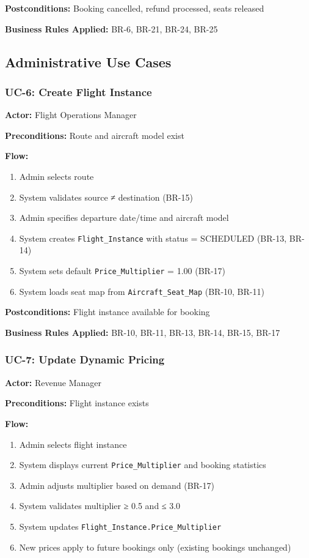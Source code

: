 \documentclass[12pt,a4paper,openany]{report}
\begin{document}
\textbf{Postconditions:} Booking cancelled, refund processed, seats released

\textbf{Business Rules Applied:} BR-6, BR-21, BR-24, BR-25

\subsection{Administrative Use Cases}

\subsubsection{UC-6: Create Flight Instance}
\textbf{Actor:} Flight Operations Manager

\textbf{Preconditions:} Route and aircraft model exist

\textbf{Flow:}
\begin{enumerate}
    \item Admin selects route
    \item System validates source ≠ destination (BR-15)
    \item Admin specifies departure date/time and aircraft model
    \item System creates \texttt{Flight\_Instance} with status = SCHEDULED (BR-13, BR-14)
    \item System sets default \texttt{Price\_Multiplier} = 1.00 (BR-17)
    \item System loads seat map from \texttt{Aircraft\_Seat\_Map} (BR-10, BR-11)
\end{enumerate}

\textbf{Postconditions:} Flight instance available for booking

\textbf{Business Rules Applied:} BR-10, BR-11, BR-13, BR-14, BR-15, BR-17

\subsubsection{UC-7: Update Dynamic Pricing}
\textbf{Actor:} Revenue Manager

\textbf{Preconditions:} Flight instance exists

\textbf{Flow:}
\begin{enumerate}
    \item Admin selects flight instance
    \item System displays current \texttt{Price\_Multiplier} and booking statistics
    \item Admin adjusts multiplier based on demand (BR-17)
    \item System validates multiplier ≥ 0.5 and ≤ 3.0
    \item System updates \texttt{Flight\_Instance.Price\_Multiplier}
    \item New prices apply to future bookings only (existing bookings unchanged)
\end{enumerate}
\end{document}

